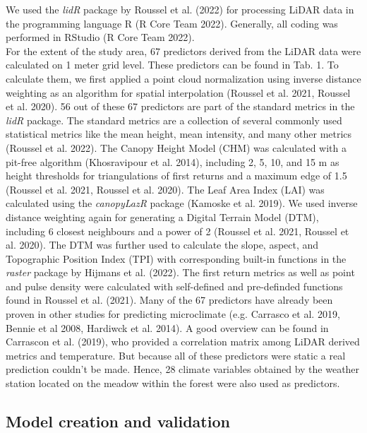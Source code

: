 \documentclass[5p]{elsarticle} %
\begin{document}
We used the \emph{lidR} package by Roussel et al. (2022) for processing LiDAR data in the programming language R (R Core Team 2022). Generally, all coding was performed in RStudio (R Core Team 2022). \\
For the extent of the study area, 67 predictors derived from the LiDAR data were calculated on 1 meter grid level. These predictors can be found in Tab. 1. To calculate them, we first applied a point cloud normalization using inverse distance weighting as an algorithm for spatial interpolation (Roussel et al. 2021, Roussel et al. 2020). 56 out of these 67 predictors are part of the standard metrics in the \emph{lidR} package. The standard metrics are a collection of several commonly used statistical metrics like the mean height, mean intensity, and many other metrics (Roussel et al. 2022). The Canopy Height Model (CHM) was calculated with a pit-free algorithm (Khosravipour et al. 2014), including 2, 5, 10, and 15 m as height thresholds for triangulations of first returns and a maximum edge of 1.5 (Roussel et al. 2021, Roussel et al. 2020). The Leaf Area Index (LAI) was calculated using the \emph{canopyLazR} package (Kamoske et al. 2019). We used inverse distance weighting again for generating a Digital Terrain Model (DTM), including 6 closest neighbours and a power of 2 (Roussel et al. 2021, Roussel et al. 2020). The DTM was further used to calculate the slope, aspect, and Topographic Position Index (TPI) with corresponding built-in functions in the \emph{raster} package by Hijmans et al. (2022). The first return metrics as well as point and pulse density were calculated with self-defined and pre-definded functions found in Roussel et al. (2021). Many of the 67 predictors have already been proven in other studies for predicting microclimate (e.g. Carrasco et al. 2019, Bennie et al 2008, Hardiwck et al. 2014). A good overview can be found in Carrascon et al. (2019), who provided a correlation matrix among LiDAR derived metrics and temperature. But because all of these predictors were static a real prediction couldn’t be made. Hence, 28 climate variables obtained by the weather station located on the meadow within the forest were also used as predictors.

\hypertarget{model creation and validation}{%
\subsection{\texorpdfstring{Model creation and validation\\
}{Model creation and validation }}\label{model-creation-and-validation}}
\end{document}
